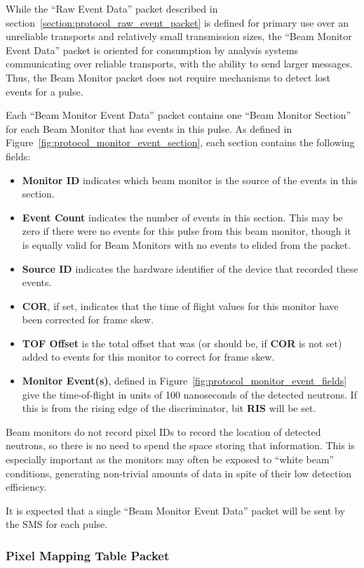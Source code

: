 While the ``Raw Event Data'' packet described in
section~\ref{section:protocol_raw_event_packet} is defined for primary use over
an unreliable transports and relatively small transmission sizes, the ``Beam
Monitor Event Data'' packet is oriented for consumption by analysis systems
communicating over reliable transports, with the ability to send larger
messages. Thus, the Beam Monitor packet does not require mechanisms to detect
lost events for a pulse.

Each ``Beam Monitor Event Data'' packet contains one ``Beam Monitor Section''
for each Beam Monitor that has events in this pulse. As defined in
Figure~\ref{fig:protocol_monitor_event_section}, each section contains the
following fields:
\begin{itemize}
\item{\bf Monitor ID} indicates which beam monitor is the source of the events
in this section.
\item{\bf Event Count} indicates the number of events in this section. This
may be zero if there were no events for this pulse from this beam monitor,
though it is equally valid for Beam Monitors with no events to elided from
the packet.
\item{\bf Source ID} indicates the hardware identifier of the device that
recorded these events.
\item{\bf COR}, if set, indicates that the time of flight values for this
monitor have been corrected for frame skew.
\item{\bf TOF Offset} is the total offset that was (or should be, if {\bf COR}
is not set) added to events for this monitor to correct for frame skew.
\item{\bf Monitor Event(s)}, defined in
Figure~\ref{fig:protocol_monitor_event_fields} give the time-of-flight in units
of 100 nanoseconds of the detected neutrons. If this is from the rising edge
of the discriminator, bit {\bf RIS} will be set.
\end{itemize}

Beam monitors do not record pixel IDs to record the location of detected
neutrons, so there is no need to spend the space storing that information.
This is especially important as the monitors may often be exposed to ``white
beam'' conditions, generating non-trivial amounts of data in spite of their
low detection efficiency.

It is expected that a single ``Beam Monitor Event Data'' packet will be sent
by the SMS for each pulse.

\newpage
\subsubsection{Pixel Mapping Table Packet}
\label{section:protocol_pixel_mapping_table}

